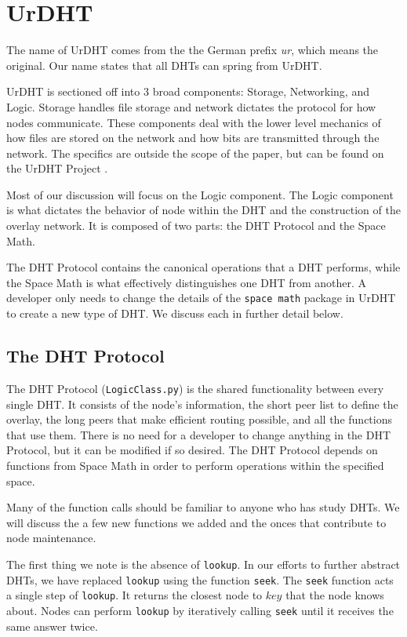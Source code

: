 \documentclass[11pt,conference]{IEEEtran}
\begin{document}
\section{UrDHT}
\label{sec:urdht}


The name of UrDHT comes from the the German prefix \textit{ur}, which means the original. 
Our name states that all DHTs can spring from UrDHT.

UrDHT is sectioned off into 3 broad components: Storage, Networking, and Logic.
Storage handles file storage and network dictates the protocol for how nodes communicate.
These components deal with the lower level mechanics of how files are stored on the network and how bits are transmitted through the network.
The specifics are outside the scope of the paper, but can be found on the UrDHT Project \cite{urdht}.

Most of our discussion will focus on the Logic component.
The Logic component is what dictates the behavior of node within the DHT and the construction of the overlay network.
It is composed of two parts: the DHT Protocol and the Space Math.

The DHT Protocol contains the canonical operations that a DHT performs, while the Space Math is what effectively distinguishes one DHT from another.
A developer only needs to change the details of the \texttt{space math} package in UrDHT to create a new type of DHT.
We discuss each in further detail below.

\subsection{The DHT Protocol }
\label{sec:protocol}

The DHT Protocol (\texttt{LogicClass.py}) \cite{urdht} is the shared functionality between every single DHT.
It consists of the node's information, the short peer list to define the overlay, the long peers that make efficient routing possible, and all the functions that use them.
There is no need for a developer to change anything in the DHT Protocol, but it can be modified if so desired.
The DHT Protocol depends on functions from Space Math in order to perform operations within the specified space.


Many of the function calls should be familiar to anyone who has study DHTs.
We will discuss the a few new functions we added and the onces that contribute to node maintenance.

The first thing we note is the absence of \texttt{lookup}.
In our efforts to further abstract DHTs, we have replaced \texttt{lookup} using the function \texttt{seek}.
The \texttt{seek} function acts a single step of \texttt{lookup}.
It returns the closest node to $ key $ that the node knows about.
Nodes can perform \texttt{lookup} by iteratively calling \texttt{seek} until it receives the same answer twice.
\end{document}
